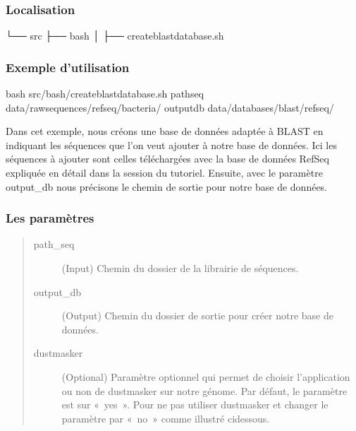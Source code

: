 \documentclass[letterpaper,10pt,french]{sphinxmanual}
\begin{document}
\subsubsection{Localisation}
\label{\detokenize{tutorial:id33}}
\begin{sphinxVerbatim}[commandchars=\\\{\}]
└── src
 ├── bash
 │   ├── create\PYGZus{}blast\PYGZus{}database.sh
\end{sphinxVerbatim}


\subsubsection{Exemple d’utilisation}
\label{\detokenize{tutorial:id34}}
\begin{sphinxVerbatim}[commandchars=\\\{\}]
bash src/bash/create\PYGZus{}blast\PYGZus{}database.sh 
             \PYGZhy{}path\PYGZus{}seq data/raw\PYGZus{}sequences/refseq/bacteria/ 
             \PYGZhy{}output\PYGZus{}db data/databases/blast/refseq/
\end{sphinxVerbatim}

Dans cet exemple, nous créons une base de données adaptée à BLAST en indiquant les séquences que l’on veut ajouter à notre base de données. Ici les séquences à ajouter sont celles téléchargées avec la base de données RefSeq expliquée en détail dans la session {\hyperref[\detokenize{tutorial:download-refseq}]{}} du tutoriel. Ensuite, avec le paramètre \sphinxhyphen{}output\_db nous précisons le chemin de sortie pour notre base de données.


\subsubsection{Les paramètres}
\label{\detokenize{tutorial:id35}}\begin{quote}\begin{description}
\item[{\sphinxhyphen{}path\_seq}] \leavevmode
(Input) Chemin du dossier de la librairie de séquences.

\item[{\sphinxhyphen{}output\_db}] \leavevmode
(Output) Chemin du dossier de sortie pour créer notre base de données.

\item[{\sphinxhyphen{}dustmasker}] \leavevmode
(Optional) Paramètre optionnel qui permet de choisir l’application ou non de dustmasker sur notre génome. Par défaut, le paramètre est sur « yes ». Pour ne pas utiliser dustmasker et changer le paramètre par « no » comme illustré ci\sphinxhyphen{}dessous.

\end{description}\end{quote}
\end{document}
